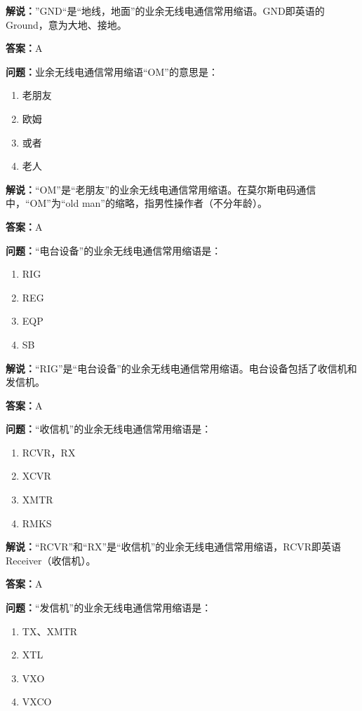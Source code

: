 \textbf{解说：}”GND“是“地线，地面”的业余无线电通信常用缩语。GND即英语的Ground，意为大地、接地。

\textbf{答案：}A

\textbf{问题：}业余无线电通信常用缩语“OM”的意思是：

\begin{enumerate}[label=\Alph*), leftmargin=1cm]
	\item 老朋友
	\item 欧姆
	\item 或者
	\item 老人
\end{enumerate}

\textbf{解说：}“OM”是“老朋友”的业余无线电通信常用缩语。在莫尔斯电码通信中，“OM”为“old man”的缩略，指男性操作者（不分年龄）。

\textbf{答案：}A

\textbf{问题：}“电台设备”的业余无线电通信常用缩语是：

\begin{enumerate}[label=\Alph*), leftmargin=1cm]
	\item RIG
	\item REG
	\item EQP
	\item SB
\end{enumerate}

\textbf{解说：}“RIG”是“电台设备”的业余无线电通信常用缩语。电台设备包括了收信机和发信机。

\textbf{答案：}A

\textbf{问题：}“收信机”的业余无线电通信常用缩语是：

\begin{enumerate}[label=\Alph*), leftmargin=1cm]
	\item RCVR，RX
	\item XCVR
	\item XMTR
	\item RMKS
\end{enumerate}

\textbf{解说：}“RCVR”和“RX”是“收信机”的业余无线电通信常用缩语，RCVR即英语Receiver（收信机）。

\textbf{答案：}A

\textbf{问题：}“发信机”的业余无线电通信常用缩语是：

\begin{enumerate}[label=\Alph*), leftmargin=1cm]
	\item TX、XMTR
	\item XTL
	\item VXO
	\item VXCO
\end{enumerate}

